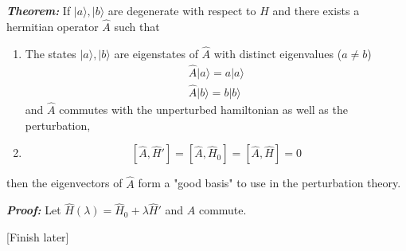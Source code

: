 \documentclass{article}
\newcommand{\ket}[1]{|#1 \rangle}
\begin{document}
\begin{dottedbox}
  \emph{\textbf{Theorem:}} If $\ket{a}, \ket{b}$ are degenerate with respect to $\hat{H}$ and there exists a hermitian operator $\hat{A}$ such that 
  \begin{enumerate}
    \item The states $\ket{a}, \ket{b}$ are eigenstates of $\hat{A}$ with distinct eigenvalues ($a \neq b$)
    \begin{align*}
      \hat{A} \ket{a} = a \ket{a} \\
      \hat{A} \ket{b} = b \ket{b} 
    \end{align*}
    and $\hat{A}$ commutes with the unperturbed hamiltonian as well as the perturbation,
    \item 
    \[ [\hat{A}, \hat{H}'] = [\hat{A}, \hat{H}_{0}] = [\hat{A}, \hat{H}] = 0 \]
  \end{enumerate}
  then the eigenvectors of $\hat{A}$ form a "good basis" to use in the perturbation theory.
\end{dottedbox}

\vskip 0.5cm
\emph{\textbf{Proof:}} Let $\hat{H}(\lambda) = \hat{H}_0 + \lambda \hat{H}'$ and $\hat{A}$ commute.

[Finish later]
\end{document}
